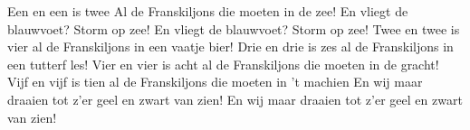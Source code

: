 \beginverse
Een en een is twee  Al de Franskiljons die moeten in de zee!
\endverse
\beginchorus
En vliegt de blauwvoet? Storm op zee!
En vliegt de blauwvoet? Storm op zee!
\endchorus
\beginverse
Twee en twee is vier  al de Franskiljons in een vaatje bier!
\endverse
\beginverse
Drie en drie is zes  al de Franskiljons in een tutterf les!
\endverse
\beginverse
Vier en vier is acht  al de Franskiljons die moeten in de gracht!
\endverse
\beginverse
Vijf en vijf is tien  al de Franskiljons die moeten in 't machien
\endverse
\beginchorus
En wij maar draaien  tot z'er geel en zwart van zien!
En wij maar draaien  tot z'er geel en zwart van zien!
\endchorus
\endsong